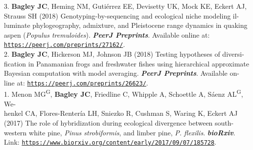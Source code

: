 \documentclass[margin,line]{res}
\begin{document}
\begin{resume}
3. \textbf{Bagley JC}, Heming NM, Guti\'{e}rrez EE, Devisetty UK, Mock KE, Eckert AJ,\\
\hspace*{8mm} Strauss SH (2018) Genotyping-by-sequencing and ecological niche modeling il-\\
\hspace*{8mm} luminate phylogeography, admixture, and Pleistocene range dynamics in quaking\\
\hspace*{8mm} aspen (\textit{Populus tremuloides}). {\it \textbf{PeerJ Preprints}}.  Available online at: \\ \vspace{2mm}
\hspace*{8mm}\href{https://peerj.com/preprints/27162/}{\tt https://peerj.com/preprints/27162/}. \\
2. \textbf{Bagley JC}, Hickerson MJ, Johnson JB (2018) Testing hypotheses of diversi-\\
\hspace*{8mm} fication in Panamanian frogs and freshwater fishes using hierarchical approximate\\
\hspace*{8mm} Bayesian computation with model averaging. {\it \textbf{PeerJ Preprints}}. Available on-\\ \vspace{2mm}
\hspace*{8mm}line at: \href{https://peerj.com/preprints/26623/}{\tt https://peerj.com/preprints/26623/}. \\
1. Menon MG\textsuperscript{G}, \textbf{Bagley JC}, Friedline C, Whipple A, Schoettle A, S\'{a}enz AL\textsuperscript{G}, We-\\
\hspace*{8mm} henkel CA, Flores-Renter\'{i}a LH, Sniezko R, Cushman S, Waring K, Eckert AJ\\
\hspace*{8mm} (2017) The role of hybridization during ecological divergence between south-\\
\hspace*{8mm} western white pine, \emph{Pinus strobiformis}, and limber pine, \emph{P. flexilis}. {\it \textbf{bioRxiv}}.\\
\hspace*{8mm} Link: \href{https://www.biorxiv.org/content/early/2017/09/07/185728}{\tt https://www.biorxiv.org/content/early/2017/09/07/185728}.



\end{resume}
\end{document}
